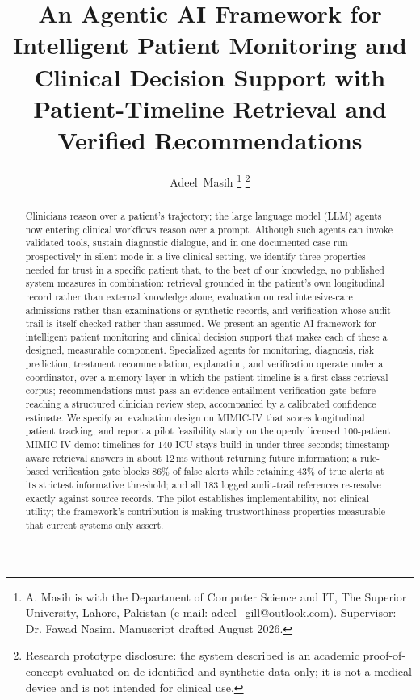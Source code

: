 \documentclass[journal]{IEEEtran}
\begin{document}
\title{An Agentic AI Framework for Intelligent Patient Monitoring and
Clinical Decision Support with Patient-Timeline Retrieval and Verified
Recommendations}

\author{Adeel~Masih%
\thanks{A. Masih is with the Department of Computer Science and IT, The Superior
University, Lahore, Pakistan (e-mail: adeel\_gill@outlook.com).
Supervisor: Dr. Fawad Nasim. Manuscript drafted August 2026.}%
\thanks{Research prototype disclosure: the system described is an academic
proof-of-concept evaluated on de-identified and synthetic data only; it is not
a medical device and is not intended for clinical use.}}

\maketitle

\begin{abstract}
Clinicians reason over a patient's trajectory; the large language model (LLM)
agents now entering clinical workflows reason over a prompt. Although such
agents can invoke validated tools, sustain diagnostic dialogue, and in one
documented case run prospectively in silent mode in a live clinical
setting, we identify three
properties needed for trust in a specific patient that, to the best of our
knowledge, no published system measures in combination: retrieval grounded in the patient's own longitudinal record rather
than external knowledge alone, evaluation on real intensive-care admissions
rather than examinations or synthetic records, and verification whose audit
trail is itself checked rather than assumed. We present an agentic AI
framework for intelligent patient monitoring and clinical decision support
that makes each of these a designed, measurable component. Specialized agents
for monitoring, diagnosis, risk prediction, treatment recommendation,
explanation, and verification operate under a coordinator, over a memory
layer in which the patient timeline is a first-class retrieval corpus;
recommendations must pass an evidence-entailment verification gate before
reaching a structured clinician review step, accompanied by a calibrated
confidence estimate. We specify an evaluation design on MIMIC-IV that scores
longitudinal patient tracking, and report a pilot feasibility study on the
openly licensed 100-patient MIMIC-IV demo: timelines for 140 ICU stays build
in under three seconds; timestamp-aware retrieval answers in about 12\,ms
without returning future information; a rule-based verification gate blocks
86\% of false alerts while retaining 43\% of true alerts at its strictest
informative threshold; and all 183 logged audit-trail references re-resolve
exactly against source records. The pilot establishes implementability, not
clinical utility; the framework's contribution is making trustworthiness
properties measurable that current systems only assert.
\end{abstract}
\end{document}
